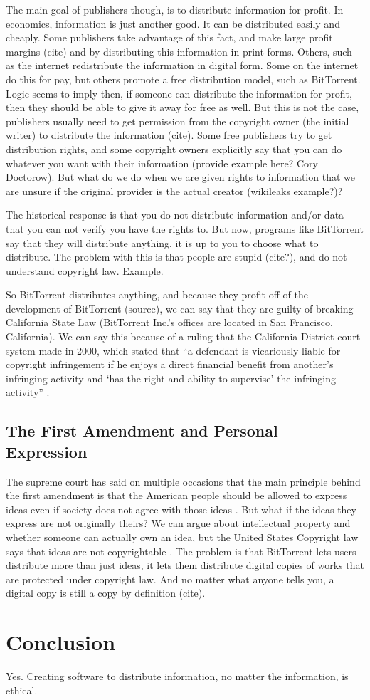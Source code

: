 \documentclass[11pt]{article}
\begin{document}
The main goal of publishers though, is to distribute information for profit. In economics, information is just another good. It can be distributed easily and cheaply. Some publishers take advantage of this fact, and make large profit margins (cite) and by distributing this information in print forms. Others, such as the internet redistribute the information in digital form. Some on the internet do this for pay, but others promote a free distribution model, such as BitTorrent. Logic seems to imply then, if someone can distribute the information for profit, then they should be able to give it away for free as well. But this is not the case, publishers usually need to get permission from the copyright owner (the initial writer) to distribute the information (cite). Some free publishers try to get distribution rights, and some copyright owners explicitly say that you can do whatever you want with their information (provide example here? Cory Doctorow). But what do we do when we are given rights to information that we are unsure if the original provider is the actual creator (wikileaks example?)?

The historical response is that you do not distribute information and/or data that you can not verify you have the rights to. But now, programs like BitTorrent say that they will distribute anything, it is up to you to choose what to distribute. The problem with this is that people are stupid (cite?), and do not understand copyright law. Example.

So BitTorrent distributes anything, and because they profit off of the development of BitTorrent (source), we can say that they are guilty of breaking California State Law (BitTorrent Inc.'s offices are located in San Francisco, California). We can say this because of a ruling that the California District court system made in 2000, which stated that ``a defendant is vicariously liable for copyright infringement if he enjoys a direct financial benefit from another's infringing activity and `has the right and ability to supervise' the infringing activity'' \cite{2000m}.

\subsection{The First Amendment and Personal Expression}

The supreme court has said on multiple occasions that the main principle behind the first amendment is that the American people should be allowed to express ideas even if society does not agree with those ideas \cite[51]{1988hustler}. But what if the ideas they express are not originally theirs? We can argue about intellectual property and whether someone can actually own an idea, but the United States Copyright law says that ideas are not copyrightable \cite{t17c1s103}. The problem is that BitTorrent lets users distribute more than just ideas, it lets them distribute digital copies of works that are protected under copyright law. And no matter what anyone tells you, a digital copy is still a copy by definition (cite).

\section{Conclusion}
Yes. Creating software to distribute information, no matter the information, is ethical.

\newpage
\singlespacing


\end{document}
